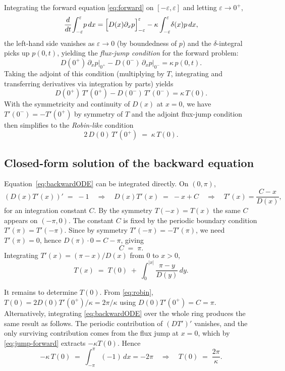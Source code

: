 Integrating the forward equation \eqref{eq:forward} on $[-\varepsilon,\varepsilon]$ and
letting $\varepsilon\to 0^+$,
\[
\frac{d}{dt}\!\int_{-\varepsilon}^{\varepsilon}\!p\,dx
= \Bigl[D(x)\partial_x p\Bigr]_{-\varepsilon}^{\varepsilon}
-\kappa\int_{-\varepsilon}^{\varepsilon}\!\delta(x)p\,dx,
\]
the left-hand side vanishes as $\varepsilon\to 0$ (by boundedness of $p$) and the
$\delta$-integral picks up $p(0,t)$, yielding the \emph{flux-jump condition} for
the forward problem:
\begin{equation}
D(0^+)\,\partial_x p\big|_{0^+}
-D(0^-)\,\partial_x p\big|_{0^-}
=\kappa\,p(0,t).
\label{eq:jump-forward}
\end{equation}
Taking the adjoint of this condition (multiplying by $T$, integrating and transferring derivatives via integration by parts) yields 
\[ D(0^+)\,T'{(0^+)}
-D(0^-)\,T'{(0^-)}
=\kappa\,T(0). \]
With the symmetricity and continuity of $D(x)$ at $x=0$, we have $T'(0^-) = -T'(0^+)$ by symmetry of $T$ and the adjoint flux-jump condition then simplifies to the \emph{Robin-like} condition
\begin{equation}
{\;
2\,D(0)\,T'(0^+) \;=\; \kappa\,T(0).
\;}\label{eq:robin}
\end{equation}

\subsection{Closed-form solution of the backward equation}

Equation~\eqref{eq:backwardODE} can be integrated directly.  On $(0,\pi)$,
\[
(D(x)T'(x))' \;=\; -1
\quad\Longrightarrow\quad
D(x)T'(x) \;=\; -x + C
\quad\Longrightarrow\quad
T'(x)=\frac{C-x}{D(x)},
\]
for an integration constant $C$.  By the symmetry $T(-x)=T(x)$ the same $C$
appears on $(-\pi,0)$.  The constant $C$ is fixed by the periodic boundary
condition $T'(\pi)=T'(-\pi)$.  Since by symmetry $T'(-\pi)=-T'(\pi)$, we need
$T'(\pi)=0$, hence $D(\pi)\cdot 0 = C-\pi$, giving
\begin{equation}
C \;=\; \pi.
\label{eq:C-pi}
\end{equation}
Integrating $T'(x)=(\pi-x)/D(x)$ from $0$ to $x>0$,
\begin{equation}
{\;
T(x) \;=\; T(0) \;+\; \int_0^{|x|}\!\frac{\pi-y}{D(y)}\,dy.
\;}\label{eq:T-of-x}
\end{equation}

It remains to determine $T(0)$.  From \eqref{eq:robin}, $T(0)=2D(0)T'(0^+)/\kappa
=2\pi/\kappa$ using $D(0)T'(0^+)=C=\pi$.  Alternatively, integrating
\eqref{eq:backwardODE} over the whole ring produces the same result as follows.
The periodic contribution of $(DT')'$ vanishes, and the only surviving
contribution comes from the flux jump at $x=0$, which by \eqref{eq:jump-forward}
extracts $-\kappa T(0)$.  Hence
\[
-\kappa\,T(0) \;=\; \int_{-\pi}^{\pi}\!(-1)\,dx = -2\pi
\quad\Longrightarrow\quad
T(0) \;=\; \frac{2\pi}{\kappa}.
\]

